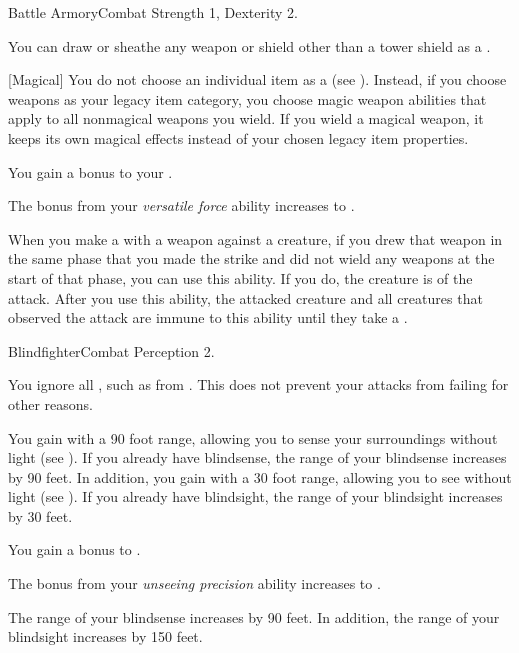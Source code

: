     \begin{feat}{Battle Armory}{Combat}
        \featpre Strength 1, Dexterity 2.

         You can draw or sheathe any weapon or shield other than a tower shield as a .

        [Magical] You do not choose an individual item as a  (see ).
        Instead, if you choose weapons as your legacy item category, you choose magic weapon abilities that apply to all nonmagical weapons you wield.
        If you wield a magical weapon, it keeps its own magical effects instead of your chosen legacy item properties.

         You gain a  bonus to your .

         The bonus from your \textit{versatile force} ability increases to .

         When you make a  with a weapon against a creature, if you drew that weapon in the same phase that you made the strike and did not wield any weapons at the start of that phase, you can use this ability.
        If you do, the creature is \unaware of the attack.
        After you use this ability, the attacked creature and all creatures that observed the attack are immune to this ability until they take a .
    \end{feat}

    \begin{feat}{Blindfighter}{Combat}
        \featpre Perception 2.

         You ignore all , such as from .
        This does not prevent your attacks from failing for other reasons.

         You gain  with a 90 foot range, allowing you to sense your surroundings without light (see ).
        If you already have blindsense, the range of your blindsense increases by 90 feet.
        In addition, you gain  with a 30 foot range, allowing you to see without light (see ).
        If you already have blindsight, the range of your blindsight increases by 30 feet.

         You gain a  bonus to .

         The bonus from your \textit{unseeing precision} ability increases to .

         The range of your blindsense increases by 90 feet.
        In addition, the range of your blindsight increases by 150 feet.
    \end{feat}

